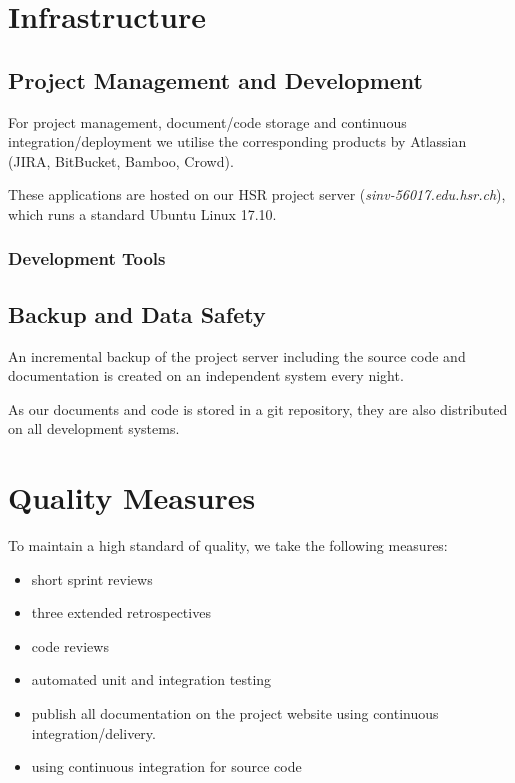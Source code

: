 \chapter{Infrastructure}


\section{Project Management and Development}

For project management, document/code storage and continuous integration/deployment we utilise the corresponding products by Atlassian (JIRA, BitBucket, Bamboo, Crowd)\cite{atlassian-opensource}.

These applications are hosted on our HSR project server (\textit{sinv-56017.edu.hsr.ch}), which runs a standard Ubuntu Linux 17.10.


\subsection{Development Tools}


\section{Backup and Data Safety}

An incremental backup of the project server including the source code and documentation is created on an independent system every night.

As our documents and code is stored in a git repository, they are also distributed on all development systems.


\chapter{Quality Measures}
To maintain a high standard of quality, we take the following measures:

\begin{multicols}{2}
    \begin{itemize}
        \item short sprint reviews
        \item three extended retrospectives
        \item code reviews
        \item automated unit and integration testing
        \item publish all documentation on the project website using continuous integration/delivery.
        \item using continuous integration for source code
    \end{itemize}
\end{multicols}


